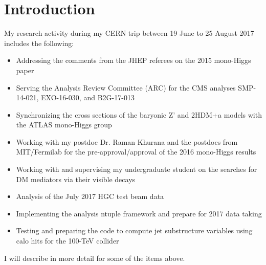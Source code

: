 \maketitle %
\tableofcontents

\section{Introduction}
My research activity during my CERN trip between 19 June to 25 August 2017 includes the following:
\begin{itemize}
 \item Addressing the comments from the JHEP referees on the 2015 mono-Higgs paper
 \item Serving the Analysis Review Committee (ARC) for the CMS analyses SMP-14-021, EXO-16-030, and B2G-17-013
 \item Synchronizing the cross sections of the baryonic Z’ and 2HDM+a models with the ATLAS mono-Higgs group
 \item Working with my postdoc Dr. Raman Khurana and the postdocs from MIT/Fermilab for the pre-approval/approval of the 2016 mono-Higgs results
 \item Working with and supervising my undergraduate student on the searches for DM mediators via their visible decays
 \item Analysis of the July 2017 HGC test beam data
 \item Implementing the analysis ntuple framework and prepare for 2017 data taking
 \item Testing and preparing the code to compute jet substructure variables using calo hits for the 100-TeV collider
\end{itemize}

I will describe in more detail for some of the items above.

